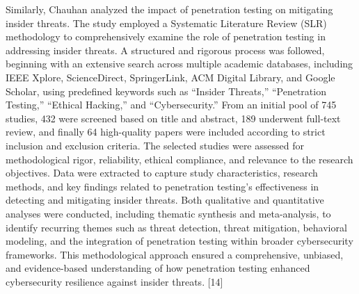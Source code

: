 \documentclass[12pt,a4paper]{report}
\begin{document}
Similarly, Chauhan  analyzed the impact of penetration testing on mitigating insider threats. The study employed a Systematic Literature Review (SLR) methodology to comprehensively examine the role of penetration testing in addressing insider threats. A structured and rigorous process was followed, beginning with an extensive search across multiple academic databases, including IEEE Xplore, ScienceDirect, SpringerLink, ACM Digital Library, and Google Scholar, using predefined keywords such as “Insider Threats,” “Penetration Testing,” “Ethical Hacking,” and “Cybersecurity.” From an initial pool of 745 studies, 432 were screened based on title and abstract, 189 underwent full-text review, and finally 64 high-quality papers were included according to strict inclusion and exclusion criteria. The selected studies were assessed for methodological rigor, reliability, ethical compliance, and relevance to the research objectives. Data were extracted to capture study characteristics, research methods, and key findings related to penetration testing’s effectiveness in detecting and mitigating insider threats. Both qualitative and quantitative analyses were conducted, including thematic synthesis and meta-analysis, to identify recurring themes such as threat detection, threat mitigation, behavioral modeling, and the integration of penetration testing within broader cybersecurity frameworks. This methodological approach ensured a comprehensive, unbiased, and evidence-based understanding of how penetration testing enhanced cybersecurity resilience against insider threats. [14]
\end{document}
